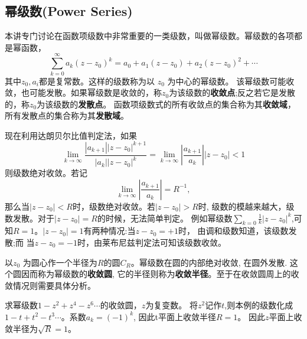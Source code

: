 \subsection{幂级数(Power Series)}
本讲专门讨论在函数项级数中非常重要的一类级数，叫做幂级数。幂级数的各项都是幂函数，
\begin{equation}
    \sum_{k=0}^{\infty} a_k\left(z-z_0\right)^k=a_0+a_1\left(z-z_0\right)+a_2\left(z-z_0\right)^2+\cdots
\end{equation}
其中$z_0, a_i$都是复常数。这样的级数称为以 $z_0$ 为中心的幂级数。
该幂级数可能收敛，也可能发散。如果幂级数是收敛的，称$z_0$为该级数的\textbf{收敛点};反之若它是发散的，称$z_0$为该级数的\textbf{发散点}。
函数项级数式的所有收敛点的集合称为其\textbf{收敛域}，所有发散点的集合称为其\textbf{发散域}。

现在利用达朗贝尔比值判定法，如果
\begin{equation}
    \lim _{k \rightarrow \infty} \frac{\left|a_{k+1}\right|\left|z-z_0\right|^{k+1}}{\left|a_k\right|\left|z-z_0\right|^k}
    =\lim _{k \rightarrow \infty}\left|\frac{a_{k+1}}{a_k}\right|\left|z-z_0\right|<1
\end{equation}
则级数绝对收敛。若记
\begin{equation}
    \lim_{k \rightarrow \infty} \left|\frac{a_{k+1}}{a_k}\right| = R^{-1},
\end{equation}
那么当$|z-z_0| < R$时，级数绝对收敛。若$|z-z_0| > R$时, 级数的模越来越大，级数发散。对于$|z-z_0| = R$的时候，无法简单判定。
例如幂级数$\sum_{k=0} \frac{1}{k} |z-z_0|^k$,可知$R=1$。$|z-z_0|=1$有两种情况:当$z-z_0 = +1$时， 由调和级数知道，该级数发散;而
当$z-z_0 = -1$时，由莱布尼兹判定法可知该级数收敛。

以$z_0$ 为圆心作一个半径为$R$的圆$C_R$。幂级数在圆的内部绝对收敛, 在圆外发散. 这个圆因而称为幂级数的\textbf{收敛圆}, 
它的半径则称为\textbf{收敛半径}。至于在收敛圆周上的收敛情况则需要具体分析。

\begin{examplebox}{求幂级数$1 - z^2 + z^4 - z^6\cdots$的收敛圆，$z$为复变数。}
    将$z^2$记作$t$,则本例的级数化成$1-t + t^2 - t^3\cdots$。系数$a_k =(-1)^k$, 因此t平面上收敛半径$R=1$。 
    因此$z$平面上收敛半径为$\sqrt{R}=1$。
\end{examplebox}

